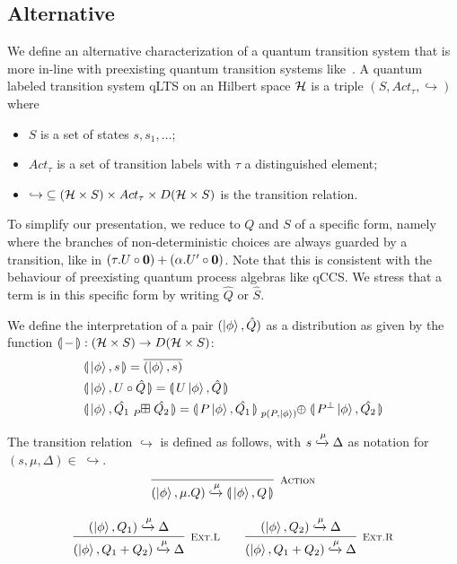\subsection{Alternative}
We define an alternative characterization of a quantum transition system that is more in-line with preexisting quantum transition systems like~\cite{fengBisimulationQuantumProcesses2012, dengOpenBisimulationQuantum2012}.
A quantum labeled transition system qLTS on an Hilbert space $\mathcal{H}$ is a triple $(S, Act_\tau, \hookrightarrow)$ where
\begin{itemize}
	\item $S$ is a set of states $s, s_1, \dots$;
	\item $Act_\tau$ is a set of transition labels with $\tau$ a distinguished element;
  \item $\hookrightarrow\;\subseteq (\mathcal{H} \times S) \times Act_\tau \times D(\mathcal{H} \times S)$ is the transition relation. 
\end{itemize}

To simplify our presentation, we reduce to $Q$ and $S$ of a specific form, namely where the branches of non-deterministic choices are always guarded by a transition, like in $(\tau. U \circ \mathbf{0}) + (\alpha . U' \circ \mathbf{0})$.
Note that this is consistent with the behaviour of preexisting quantum process algebras like qCCS.
We stress that a term is in this specific form by writing $\hat{Q}$ or $\hat{S}$.

We define the interpretation of a pair $(\ket{\phi}, \hat{Q})$ as a distribution as given by the function $\llparenthesis\,{-}\,\rrparenthesis : (\mathcal{H} \times S) \to D(\mathcal{H} \times S)$:
\begin{align*}
	&\sema{\ket{\phi}, s} = \overline{(\ket{\phi}, s)} \\
	&\sema{\ket{\phi}, U \circ \hat{Q}} = \sema{U\ket{\phi}, \hat{Q}} \\
	&\sema{\ket{\phi}, \hat{Q_1} \qsum{P} \hat{Q_2} } = \sema{P \ket{\phi}, \hat{Q_1}} \psum{p(P, \ket{\phi})} \sema{P^{\bot}\ket{\phi}, \hat{Q_2}} 
\end{align*}

The transition relation $\hookrightarrow$ is defined as follows, with $s \xhookrightarrow{\mu} \Delta$ as notation for $(s, \mu, \Delta) \in\;\hookrightarrow$.
\begin{gather*}
  \infer[\mbox{\footnotesize\scshape Action}]{(\ket{\phi}, \mu.Q) \xhookrightarrow{\mu} \sema{\ket{\phi}, Q}}{} \\[0.3cm]
  \infer[\mbox{\footnotesize\scshape Ext.L}]{(\ket{\phi}, Q_1 + Q_2) \xhookrightarrow{\mu} \Delta}{(\ket{\phi}, Q_1) \xhookrightarrow{\mu} \Delta} \qquad
  \infer[\mbox{\footnotesize\scshape Ext.R}]{(\ket{\phi}, Q_1 + Q_2) \xhookrightarrow{\mu} \Delta}{(\ket{\phi}, Q_2) \xhookrightarrow{\mu} \Delta}
\end{gather*}

